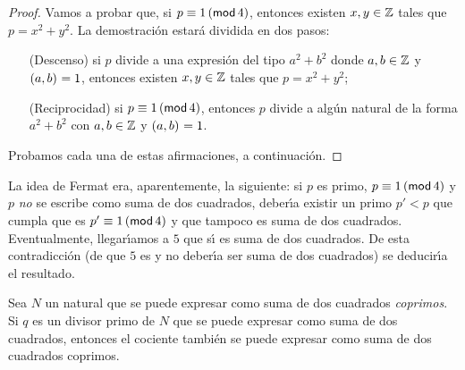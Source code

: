 \begin{proof}
	Vamos a probar que, si $p\equiv 1\tmodulo[4]$, entonces existen
	$x,y\in\Enteros$ tales que $p=x^2+y^2$. La demostraci\'on estar\'a
	dividida en dos pasos:
	\begin{itemize}
		\item[(Descenso)]
			si $p$ divide a una expresi\'on del tipo $a^2+b^2$
			donde $a,b\in\Enteros$ y $\mcd{a,b}=1$, entonces
			existen $x,y\in\Enteros$ tales que $p=x^2+y^2$;
		\item[(Reciprocidad)]
			si $p\equiv 1\tmodulo[4]$, entonces $p$ divide a
			alg\'un natural de la forma $a^2+b^2$ con
			$a,b\in\Enteros$ y $\mcd{a,b}=1$.
	\end{itemize}
	Probamos cada una de estas afirmaciones, a continuaci\'on.
\end{proof}

La idea de Fermat era, aparentemente, la siguiente: si $p$ es primo,
$p\equiv 1\tmodulo[4]$ y $p$ \emph{no} se escribe como suma de dos cuadrados,
deber\'{\i}a existir un primo $p'<p$ que cumpla que es $p'\equiv 1\tmodulo[4]$
y que tampoco es suma de dos cuadrados. Eventualmente, llegar\'{\i}amos a $5$
que s\'{\i} es suma de dos cuadrados. De esta contradicci\'on
(de que $5$ es y no deber\'{\i}a ser suma de dos cuadrados) se deducir\'{\i}a
el resultado.

\begin{lemaFermat}\label{lema:fermat:descenso:pre}
	Sea $N$ un natural que se puede expresar como suma de dos cuadrados
	\emph{coprimos}. Si $q$ es un divisor primo de $N$ que se puede
	expresar como suma de dos cuadrados, entonces el cociente tambi\'en
	se puede expresar como suma de dos cuadrados coprimos.
\end{lemaFermat}

